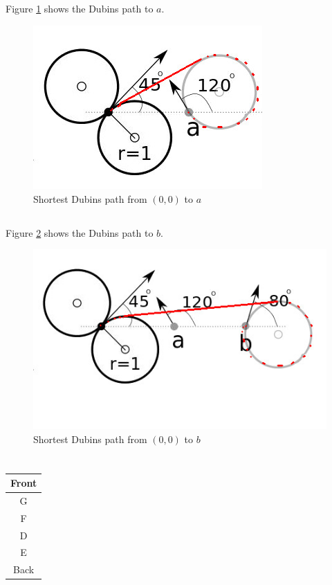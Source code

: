 \documentclass[12pt]{article}
\begin{document}
\subsection{}

Figure \ref{fig_dubinsa} shows the Dubins path to $a$.
\begin{figure}
    \center
    \includegraphics[width=0.5\linewidth]{img/dubinsA}
    \caption{Shortest Dubins path from $(0,0)$ to $a$}
    \label{fig_dubinsa}
\end{figure}

\subsection{}
Figure \ref{fig_dubinsb} shows the Dubins path to $b$.
\begin{figure}
    \center
    \includegraphics[width=0.5\linewidth]{img/dubinsB}
    \caption{Shortest Dubins path from $(0,0)$ to $b$}
    \label{fig_dubinsb}
\end{figure}


\section{} %
\subsection{}

\begin{tabular}{ c }
  Front \\
  \hline
  G \\
  F \\
  D \\
  E \\
  \hline
  Back
\end{tabular}
\end{document}
